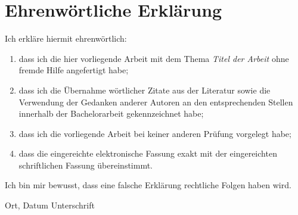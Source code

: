 \clearpage
\chapter*{Ehrenwörtliche Erklärung}	



Ich erkläre hiermit ehrenwörtlich: 

\begin{enumerate}
	\item dass ich die hier vorliegende Arbeit mit dem Thema \textit{Titel der Arbeit} ohne fremde Hilfe angefertigt habe; 
	\item dass ich die Übernahme wörtlicher Zitate aus der Literatur sowie die Verwendung der Gedanken anderer Autoren an den entsprechenden Stellen innerhalb der Bachelorarbeit gekennzeichnet habe;
	\item dass ich die vorliegende Arbeit bei keiner anderen Prüfung vorgelegt habe; 
	\item dass die eingereichte elektronische Fassung exakt mit der eingereichten schriftlichen Fassung übereinstimmt.
\end{enumerate}
Ich bin mir bewusst, dass eine falsche Erklärung rechtliche Folgen haben wird.

\vspace{3cm}
Ort, Datum \hfill Unterschrift 